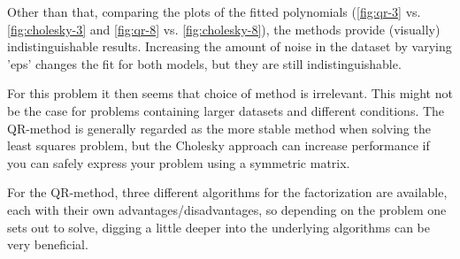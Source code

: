 \documentclass[12pt]{article}
\begin{document}
Other than that, comparing the plots of the fitted polynomials 
(\ref{fig:qr-3} vs. \ref{fig:cholesky-3} and \ref{fig:qr-8} vs. \ref{fig:cholesky-8}), 
the methods provide (visually) indistinguishable results.
Increasing the amount of noise in the dataset by varying 'eps' changes the fit
for both models, but they are still indistinguishable.

For this problem it then seems that choice of method is irrelevant. This might not
be the case for problems containing larger datasets and different conditions.
The QR-method is generally regarded as the more stable method when solving
the least squares problem, but the Cholesky approach can increase performance
if you can safely express your problem using a symmetric matrix. 

For the QR-method, three different algorithms for the factorization are available,
each with their own advantages/disadvantages, so depending on the problem one sets out
to solve, digging a little deeper into the underlying algorithms can be very beneficial.
\end{document}
